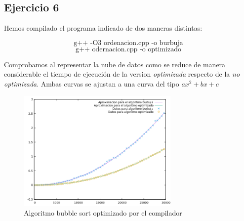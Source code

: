 \subsection*{Ejercicio 6}


\begin{flushleft}
  Hemos compilado el programa indicado de dos maneras distintas:

  \[
    \text{g++ -O3 ordenacion.cpp -o burbuja}
  \]\[
        \text{g++ odernacion.cpp -o optimizado}
  \]
  
  Comprobamos al representar la nube de datos como se reduce de manera
  considerable el tiempo de ejecución de la version
  \textit{optimizada} respecto de la \textit{no optimizada}. Ambas curvas se ajustan a una curva del tipo $ax^2 +bx + c$
\end{flushleft}

\begin{figure}[H]
  \caption{Algoritmo bubble sort optimizado por el compilador}
  \centering
    \includegraphics[width=0.7\textwidth]{ejer6/comparacion.png}
\end{figure}
